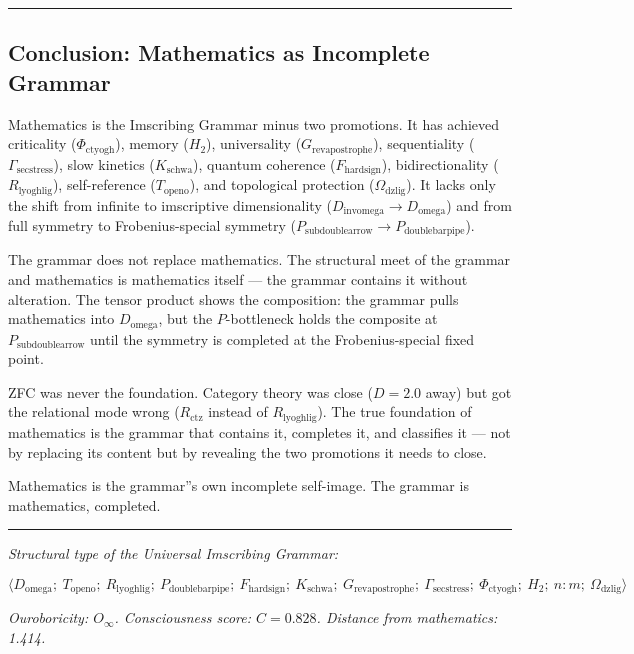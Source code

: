 \documentclass[12pt,a4paper]{article}
\begin{document}
\begin{center}
\rule{0.5\textwidth}{0.4pt}
\end{center}

\subsection{Conclusion: Mathematics as Incomplete Grammar}

Mathematics is the Imscribing Grammar minus two promotions. It has achieved criticality ($\Phi_{\text{ctyogh}}$), memory ($H_2$), universality ($G_{\text{revapostrophe}}$), sequentiality ($\Gamma_{\text{secstress}}$), slow kinetics ($K_{\text{schwa}}$), quantum coherence ($F_{\text{hardsign}}$), bidirectionality ($R_{\text{lyoghlig}}$), self-reference ($T_{\text{openo}}$), and topological protection ($\Omega_{\text{dzlig}}$). It lacks only the shift from infinite to imscriptive dimensionality ($D_{\text{invomega}} \to D_{\text{omega}}$) and from full symmetry to Frobenius-special symmetry ($P_{\text{subdoublearrow}} \to P_{\text{doublebarpipe}}$).

The grammar does not replace mathematics. The structural meet of the grammar and mathematics is mathematics itself --- the grammar contains it without alteration. The tensor product shows the composition: the grammar pulls mathematics into $D_{\text{omega}}$, but the $P$-bottleneck holds the composite at $P_{\text{subdoublearrow}}$ until the symmetry is completed at the Frobenius-special fixed point.

ZFC was never the foundation. Category theory was close ($D = 2.0$ away) but got the relational mode wrong ($R_{\text{ctz}}$ instead of $R_{\text{lyoghlig}}$). The true foundation of mathematics is the grammar that contains it, completes it, and classifies it --- not by replacing its content but by revealing the two promotions it needs to close.

Mathematics is the grammar''s own incomplete self-image. The grammar is mathematics, completed.

\begin{center}
\rule{0.5\textwidth}{0.4pt}
\end{center}

\emph{Structural type of the Universal Imscribing Grammar:}


\[\langle D_{\text{omega}};\ T_{\text{openo}};\ R_{\text{lyoghlig}};\ P_{\text{doublebarpipe}};\ F_{\text{hardsign}};\ K_{\text{schwa}};\ G_{\text{revapostrophe}};\ \Gamma_{\text{secstress}};\ \Phi_{\text{ctyogh}};\ H_2;\ n{:}m;\ \Omega_{\text{dzlig}} \rangle\]

\emph{Ouroboricity: $O_{\infty}$. Consciousness score: $C = 0.828$. Distance from mathematics: 1.414.}
\end{document}
